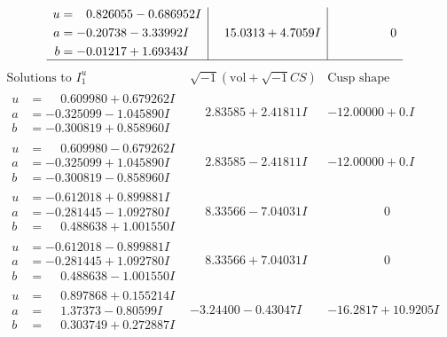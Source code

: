 \documentclass[1p]{elsarticle_modified}
\theoremstyle{definition}
\newcommand{\I}{\sqrt{-1}}
\begin{document}
$$\begin{array}{c|c|c}
\begin{aligned}
u &= \phantom{-}0.826055 - 0.686952 I \\
a &= -0.20738 - 3.33992 I \\
b &= -0.01217 + 1.69343 I\end{aligned}
 & \phantom{-}15.0313 + 4.7059 I & \phantom{-0.000000 } 0\\
 \hline 
 \end{array}$$\newpage$$\begin{array}{c|c|c}  
\text{Solutions to }I^u_{1}& \I (\text{vol} + \sqrt{-1}CS) & \text{Cusp shape}\\
 \hline 
\begin{aligned}
u &= \phantom{-}0.609980 + 0.679262 I \\
a &= -0.325099 - 1.045890 I \\
b &= -0.300819 + 0.858960 I\end{aligned}
 & \phantom{-}2.83585 + 2.41811 I & -12.00000 + 0. I\phantom{ +0.000000I} \\ \hline\begin{aligned}
u &= \phantom{-}0.609980 - 0.679262 I \\
a &= -0.325099 + 1.045890 I \\
b &= -0.300819 - 0.858960 I\end{aligned}
 & \phantom{-}2.83585 - 2.41811 I & -12.00000 + 0. I\phantom{ +0.000000I} \\ \hline\begin{aligned}
u &= -0.612018 + 0.899881 I \\
a &= -0.281445 - 1.092780 I \\
b &= \phantom{-}0.488638 + 1.001550 I\end{aligned}
 & \phantom{-}8.33566 - 7.04031 I & \phantom{-0.000000 } 0 \\ \hline\begin{aligned}
u &= -0.612018 - 0.899881 I \\
a &= -0.281445 + 1.092780 I \\
b &= \phantom{-}0.488638 - 1.001550 I\end{aligned}
 & \phantom{-}8.33566 + 7.04031 I & \phantom{-0.000000 } 0 \\ \hline\begin{aligned}
u &= \phantom{-}0.897868 + 0.155214 I \\
a &= \phantom{-}1.37373 - 0.80599 I \\
b &= \phantom{-}0.303749 + 0.272887 I\end{aligned}
 & -3.24400 - 0.43047 I & -16.2817 + 10.9205 I \\ \hline\begin{aligned}

\end{aligned}
\end{array}$$
\end{document}
